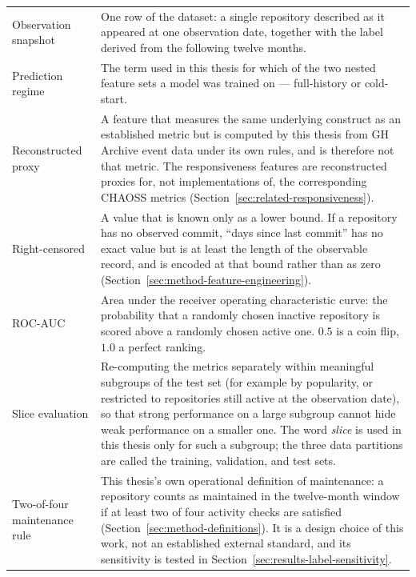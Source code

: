 {\begin{longtable}{p{} p{}}
Observation snapshot &
One row of the dataset: a single repository described as it appeared at one
observation date, together with the label derived from the following twelve
months. \\

Prediction regime &
The term used in this thesis for which of the two nested feature sets a model was
trained on --- full-history or cold-start. \\

Reconstructed proxy &
A feature that measures the same underlying construct as an established metric but
is computed by this thesis from GH Archive event data under its own rules, and is
therefore not that metric. The responsiveness features are reconstructed proxies
for, not implementations of, the corresponding CHAOSS metrics
(Section~\ref{sec:related-responsiveness}). \\

Right-censored &
A value that is known only as a lower bound. If a repository has no observed
commit, ``days since last commit'' has no exact value but is at least the length
of the observable record, and is encoded at that bound rather than as zero
(Section~\ref{sec:method-feature-engineering}). \\

ROC-AUC &
Area under the receiver operating characteristic curve: the probability that a
randomly chosen inactive repository is scored above a randomly chosen active one.
\(0.5\) is a coin flip, \(1.0\) a perfect ranking. \\

Slice evaluation &
Re-computing the metrics separately within meaningful subgroups of the test set
(for example by popularity, or restricted to repositories still active at the
observation date), so that strong performance on a large subgroup cannot hide weak
performance on a smaller one. The word \emph{slice} is used in this thesis only for
such a subgroup; the three data partitions are called the training, validation, and
test sets. \\

Two-of-four maintenance rule &
This thesis's own operational definition of maintenance: a repository counts as
maintained in the twelve-month window if at least two of four activity checks are
satisfied (Section~\ref{sec:method-definitions}). It is a design choice of this
work, not an established external standard, and its sensitivity is tested in
Section~\ref{sec:results-label-sensitivity}. \\
\hline
\end{longtable}
}
